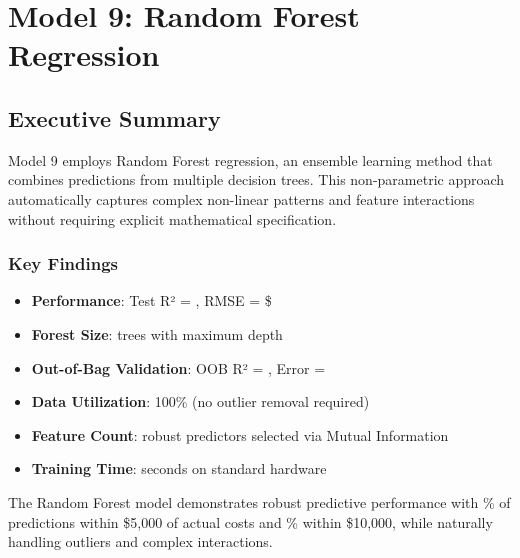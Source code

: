 
\chapter{Model 9: Random Forest Regression}\label{ch:model9}



\section{Executive Summary}

Model 9 employs Random Forest regression, an ensemble learning method that combines predictions from multiple decision trees. This non-parametric approach automatically captures complex non-linear patterns and feature interactions without requiring explicit mathematical specification.

\subsection{Key Findings}

\begin{itemize}
    \item \textbf{Performance}: Test R² = \ModelNineRSquaredTest{}, RMSE = \$\ModelNineRMSETest{}
    \item \textbf{Forest Size}: \ModelNineNTrees{} trees with maximum depth \ModelNineMaxDepth{}
    \item \textbf{Out-of-Bag Validation}: OOB R² = \ModelNineOOBRSquared{}, Error = \ModelNineOOBError{}
    \item \textbf{Data Utilization}: 100\% (no outlier removal required)
    \item \textbf{Feature Count}: \ModelNineNumFeatures{} robust predictors selected via Mutual Information
    \item \textbf{Training Time}: \ModelNineTrainingTime{} seconds on standard hardware
\end{itemize}

The Random Forest model demonstrates robust predictive performance with \ModelNineWithinFiveK{}\% of predictions within \$5,000 of actual costs and \ModelNineWithinTenK{}\% within \$10,000, while naturally handling outliers and complex interactions.

